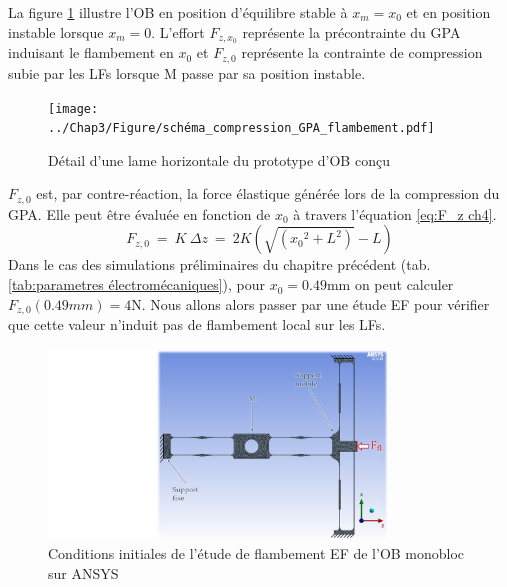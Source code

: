 La figure \ref{fig:schema_compression_GPA_ch4} illustre l'OB en position d'équilibre stable à $x_m=x_0$ et en position instable lorsque $x_m=0$. L'effort $F_{z,x_0}$ représente la précontrainte du GPA induisant le flambement en $x_0$ et $F_{z,0}$ représente la contrainte de compression subie par les LFs lorsque M passe par sa position instable.
\begin{figure}[!htb]
	\begin{center}
		\captionsetup{justification=centering}
		\texttt{[image: ../Chap3/Figure/schéma\_compression\_GPA\_flambement.pdf]}
		\caption{Détail d'une lame horizontale du prototype d'OB conçu}
		\label{fig:schema_compression_GPA_ch4}
	\end{center}
\end{figure}  
$F_{z,0}$ est, par contre-réaction, la force élastique générée lors de la compression du GPA. Elle peut être évaluée en fonction de $x_0$ à travers l'équation \ref{eq:F_z ch4}. 
\begin{equation}
	F_{z,0}\ =\ K\ \Delta z\ =\  2K(\sqrt{({x_0}^2+L^2)}-L)
	\label{eq:F_z ch4}
\end{equation}
Dans le cas des simulations préliminaires du chapitre précédent (tab.\ref{tab:parametres électromécaniques}), pour $x_0=0.49$mm on peut calculer $F_{z,0}(0.49mm)=4$N. Nous allons alors passer par une étude EF pour vérifier que cette valeur n'induit pas de flambement local sur les LFs.
\begin{figure}
\begin{center}
    \captionsetup{justification=centering}
	\includegraphics[trim={11cm 0cm 0cm 0cm},clip, width=0.8\textwidth]{../Chap3/Figure/EF_flambement_CI.pdf}
	\caption{Conditions initiales de l'étude de flambement EF de l'OB monobloc sur ANSYS}
	\label{fig:EF_flambement_CI}
\end{center}
\end{figure}

